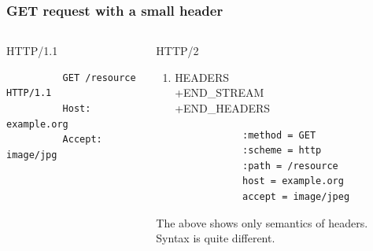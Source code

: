 \documentclass[lualatex]{beamer}
\begin{document}
\begin{frame}[fragile]
  \frametitle{GET request with a small header}

  \begin{columns}[t]
    \begin{column}{.45\textwidth}
      \begin{block}{HTTP/1.1}
        \begin{verbatim}
          GET /resource HTTP/1.1
          Host: example.org
          Accept: image/jpg
        \end{verbatim}
      \end{block}
    \end{column}
    \begin{column}{.45\textwidth}
      \begin{block}{HTTP/2}
        \begin{enumerate}
        \item HEADERS\\+END\_STREAM\\+END\_HEADERS
          \begin{verbatim}
            :method = GET
            :scheme = http
            :path = /resource
            host = example.org
            accept = image/jpeg
          \end{verbatim}
        \end{enumerate}
        The above shows only semantics of headers.
        Syntax is quite different.
      \end{block}
    \end{column}
  \end{columns}
\end{frame}
\end{document}
